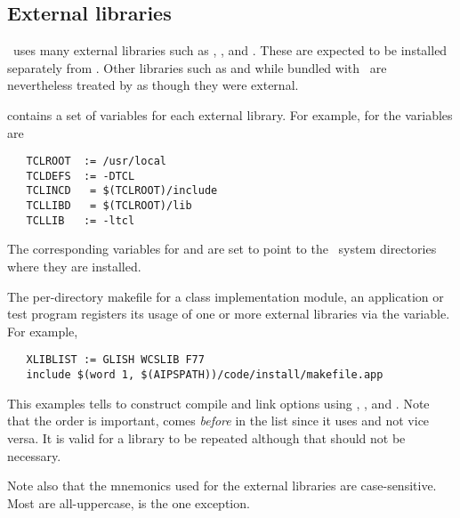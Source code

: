\subsection*{External libraries}



\aipspp\ uses many external libraries such as , ,
and .  These are expected to be installed separately from \aipspp.
Other libraries such as  and  while bundled with
\aipspp\ are nevertheless treated by  as though they were
external.

 contains a set of variables for each external library.  For
example, for  the variables are

\begin{verbatim}
   TCLROOT  := /usr/local
   TCLDEFS  := -DTCL
   TCLINCD   = $(TCLROOT)/include
   TCLLIBD   = $(TCLROOT)/lib
   TCLLIB   := -ltcl
\end{verbatim}

\noindent
The corresponding variables for  and  are set to
point to the \aipspp\ system directories where they are installed.

The per-directory makefile for a class implementation module, an application
or test program registers its usage of one or more external libraries via the
 variable.  For example,

\begin{verbatim}
   XLIBLIST := GLISH WCSLIB F77
   include $(word 1, $(AIPSPATH))/code/install/makefile.app
\end{verbatim}

\noindent
This examples tells  to construct compile and link options
using , , and .  Note that the order
is important,  comes {\em before}  in the list since
it uses  and not vice versa.  It is valid for a library to be
repeated although that should not be necessary.

Note also that the mnemonics used for the external libraries are
case-sensitive.  Most are all-uppercase,  is the one exception.

